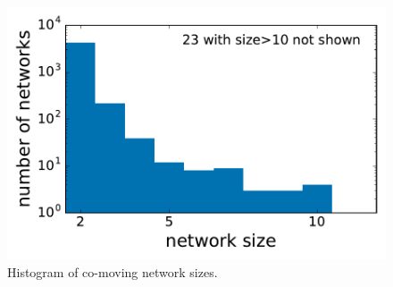 \documentclass[manuscript, letterpaper]{aastex6}
\begin{document}
\begin{figure}[p]
  \begin{center}
    \includegraphics[width=\textwidth]{figures/dist_networksize.pdf}
  \end{center}
  \caption{%
    Histogram of co-moving network sizes.
    \label{fig:hist_Nneighbors}}
\end{figure}
\end{document}
